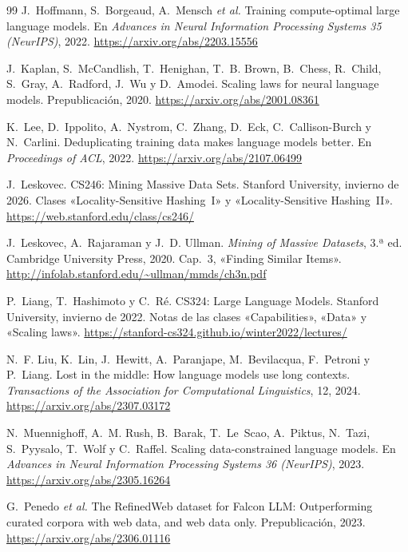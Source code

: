 \begin{thebibliography}{99}
J.~Hoffmann, S.~Borgeaud, A.~Mensch \emph{et al.}
\newblock Training compute-optimal large language models.
\newblock En \emph{Advances in Neural Information Processing Systems 35 (NeurIPS)}, 2022.
\newblock \url{https://arxiv.org/abs/2203.15556}

J.~Kaplan, S.~McCandlish, T.~Henighan, T.~B. Brown, B.~Chess, R.~Child, S.~Gray, A.~Radford, J.~Wu y D.~Amodei.
\newblock Scaling laws for neural language models.
\newblock Prepublicación, 2020.
\newblock \url{https://arxiv.org/abs/2001.08361}

K.~Lee, D.~Ippolito, A.~Nystrom, C.~Zhang, D.~Eck, C.~Callison-Burch y N.~Carlini.
\newblock Deduplicating training data makes language models better.
\newblock En \emph{Proceedings of ACL}, 2022.
\newblock \url{https://arxiv.org/abs/2107.06499}

J.~Leskovec.
\newblock CS246: Mining Massive Data Sets.
\newblock Stanford University, invierno de 2026. Clases «Locality-Sensitive Hashing~I» y «Locality-Sensitive Hashing~II».
\newblock \url{https://web.stanford.edu/class/cs246/}

J.~Leskovec, A.~Rajaraman y J.~D. Ullman.
\newblock \emph{Mining of Massive Datasets}, 3.ª ed.
\newblock Cambridge University Press, 2020.
\newblock Cap.~3, «Finding Similar Items».
\newblock \url{http://infolab.stanford.edu/~ullman/mmds/ch3n.pdf}

P.~Liang, T.~Hashimoto y C.~Ré.
\newblock CS324: Large Language Models.
\newblock Stanford University, invierno de 2022. Notas de las clases «Capabilities», «Data» y «Scaling laws».
\newblock \url{https://stanford-cs324.github.io/winter2022/lectures/}

N.~F. Liu, K.~Lin, J.~Hewitt, A.~Paranjape, M.~Bevilacqua, F.~Petroni y P.~Liang.
\newblock Lost in the middle: How language models use long contexts.
\newblock \emph{Transactions of the Association for Computational Linguistics}, 12, 2024.
\newblock \url{https://arxiv.org/abs/2307.03172}

N.~Muennighoff, A.~M. Rush, B.~Barak, T.~Le~Scao, A.~Piktus, N.~Tazi, S.~Pyysalo, T.~Wolf y C.~Raffel.
\newblock Scaling data-constrained language models.
\newblock En \emph{Advances in Neural Information Processing Systems 36 (NeurIPS)}, 2023.
\newblock \url{https://arxiv.org/abs/2305.16264}

G.~Penedo \emph{et al.}
\newblock The RefinedWeb dataset for Falcon LLM: Outperforming curated corpora with web data, and web data only.
\newblock Prepublicación, 2023.
\newblock \url{https://arxiv.org/abs/2306.01116}


\end{thebibliography}
